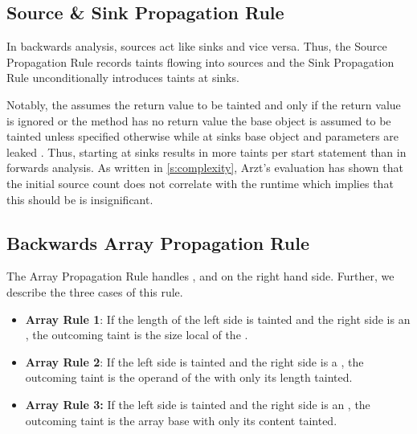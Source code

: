 \documentclass[../draft.tex]{subfiles}
\begin{document}
    \subsection{Source \& Sink Propagation Rule}\label{s:sourcerule}
    In backwards analysis, sources act like sinks and vice versa. Thus, the Source Propagation Rule records taints flowing into sources and the Sink Propagation Rule unconditionally introduces taints at sinks.

    Notably, the  assumes the return value to be tainted and only if the return value is ignored or the method has no return value the base object is assumed to be tainted unless specified otherwise while at sinks base object and parameters are leaked \cite{Arzt2017PhD}. Thus, starting at sinks results in more taints per start statement than in forwards analysis. As written in \autoref{s:complexity}, Arzt's evaluation has shown that the initial source count does not correlate with the runtime which implies that this should be is insignificant.
    

    \subsection{Backwards Array Propagation Rule}
    The Array Propagation Rule handles ,  and  on the right hand side. Further, we describe the three cases of this rule.

    \begin{itemize}
        \item \textbf{Array Rule 1}: If the length of the left side is tainted and the right side is an , the outcoming taint is the size local of the .
        \item  \textbf{Array Rule 2}: If the left side is tainted and the right side is a , the outcoming taint is the operand of the  with only its length tainted.
        \item \textbf{Array Rule 3:} If the left side is tainted and the right side is an , the outcoming taint is the array base with only its content tainted.
    \end{itemize}
\end{document}
